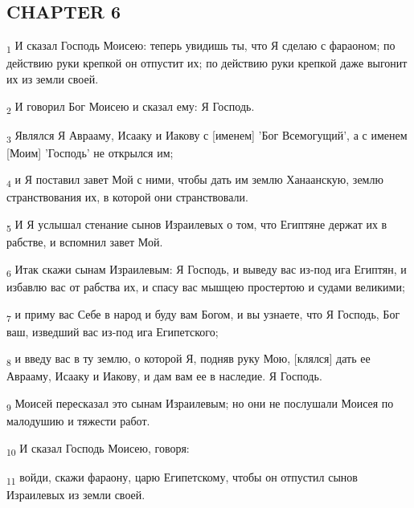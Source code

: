 \subsection{CHAPTER 6}
\begin{tcolorbox}
\textsubscript{1} И сказал Господь Моисею: теперь увидишь ты, что Я сделаю с фараоном; по действию руки крепкой он отпустит их; по действию руки крепкой даже выгонит их из земли своей.
\end{tcolorbox}
\begin{tcolorbox}
\textsubscript{2} И говорил Бог Моисею и сказал ему: Я Господь.
\end{tcolorbox}
\begin{tcolorbox}
\textsubscript{3} Являлся Я Аврааму, Исааку и Иакову с [именем] 'Бог Всемогущий', а с именем [Моим] 'Господь' не открылся им;
\end{tcolorbox}
\begin{tcolorbox}
\textsubscript{4} и Я поставил завет Мой с ними, чтобы дать им землю Ханаанскую, землю странствования их, в которой они странствовали.
\end{tcolorbox}
\begin{tcolorbox}
\textsubscript{5} И Я услышал стенание сынов Израилевых о том, что Египтяне держат их в рабстве, и вспомнил завет Мой.
\end{tcolorbox}
\begin{tcolorbox}
\textsubscript{6} Итак скажи сынам Израилевым: Я Господь, и выведу вас из-под ига Египтян, и избавлю вас от рабства их, и спасу вас мышцею простертою и судами великими;
\end{tcolorbox}
\begin{tcolorbox}
\textsubscript{7} и приму вас Себе в народ и буду вам Богом, и вы узнаете, что Я Господь, Бог ваш, изведший вас из-под ига Египетского;
\end{tcolorbox}
\begin{tcolorbox}
\textsubscript{8} и введу вас в ту землю, о которой Я, подняв руку Мою, [клялся] дать ее Аврааму, Исааку и Иакову, и дам вам ее в наследие. Я Господь.
\end{tcolorbox}
\begin{tcolorbox}
\textsubscript{9} Моисей пересказал это сынам Израилевым; но они не послушали Моисея по малодушию и тяжести работ.
\end{tcolorbox}
\begin{tcolorbox}
\textsubscript{10} И сказал Господь Моисею, говоря:
\end{tcolorbox}
\begin{tcolorbox}
\textsubscript{11} войди, скажи фараону, царю Египетскому, чтобы он отпустил сынов Израилевых из земли своей.
\end{tcolorbox}
